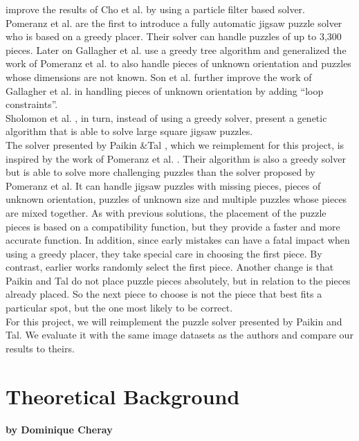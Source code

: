 \documentclass[11pt]{report}
\begin{document}
\cite{yang2011particle} improve the results of Cho et al. by using a particle filter
based solver. \\
Pomeranz et al. \cite{Pomeranz2011} are the first to introduce a fully
automatic jigsaw puzzle solver who is based on a greedy placer. Their solver
can handle puzzles of up to 3,300 pieces. Later on Gallagher et al.
\cite{gallagher2012jigsaw} use a greedy tree algorithm and generalized the work
of Pomeranz et al. to also handle pieces of unknown orientation and puzzles
whose dimensions are not known. Son et al. \cite{son2014solving} further
improve the work of Gallagher et al. in handling pieces of unknown orientation
by adding ``loop constraints''. \\
Sholomon et al. \cite{sholomon2013genetic}, in turn, instead of using a greedy
solver, present a genetic algorithm that is able to solve large square jigsaw
puzzles. \\
The solver presented by Paikin \&Tal \cite{Paikin2015}, which we reimplement for
this project, is inspired by the work of Pomeranz et al. \cite{Pomeranz2011}.
Their algorithm is also a greedy solver but is able to solve more challenging
puzzles than the solver proposed by Pomeranz et al. It can handle jigsaw puzzles with
missing pieces, pieces of unknown orientation, puzzles of unknown size and
multiple puzzles whose pieces are mixed together. As with previous solutions,
the placement of the puzzle pieces is based on a compatibility function, but
they provide a faster and more accurate function. In addition, since early
mistakes can have a fatal impact when using a greedy placer, they take special
care in choosing the first piece. By contrast, earlier works randomly select the
first piece. Another change is that Paikin and Tal do not place puzzle pieces
absolutely, but in relation to the pieces already placed. So the next piece to
choose is not the piece that best fits a particular spot, but the one most
likely to be correct.\\
For this project, we will reimplement the puzzle solver presented by
Paikin and Tal. We evaluate it with the same image datasets as the authors and
compare our results to theirs.


\chapter{Theoretical Background}
\subsubsection*{by Dominique Cheray}
\end{document}
